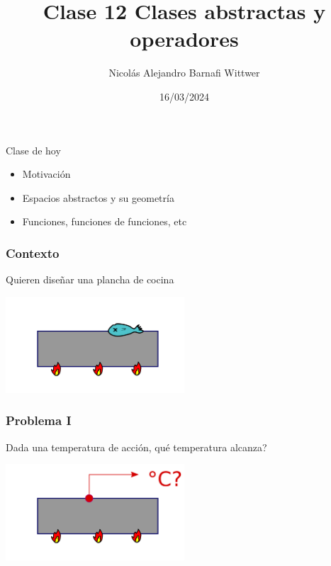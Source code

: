 \documentclass[12pt,aspectratio=169,xcolor=dvipsnames]{beamer}
\title[short title]{Clase 12 Clases abstractas y operadores}
\subtitle{}
\author[NA Barnafi] {Nicolás Alejandro Barnafi Wittwer}
\institute[UC|CMM] 
{
    Pontificia Universidad Católica de Chile \\
    Centro de Modelamiento Matemático
}
\date{16/03/2024}
\begin{document}
\begin{frame}
    \maketitle
\end{frame}
\begin{frame}{Clase de hoy}
    \begin{itemize}
        \item Motivación
        \item Espacios abstractos y su geometría
        \item Funciones, funciones de funciones, etc
    \end{itemize}

    \vspace{1cm}

\end{frame}
\begin{frame}\frametitle{Contexto}
Quieren diseñar una plancha de cocina

    \begin{center}
        \includegraphics[width=0.5\textwidth]{../images/plancha.png}
    \end{center}
\end{frame}
\begin{frame}\frametitle{Problema I}
    Dada una temperatura de acción, qué temperatura alcanza?

    \begin{center}
        \includegraphics[width=0.5\textwidth]{../images/plancha-medida.png}
    \end{center}

\end{frame}
\end{document}
